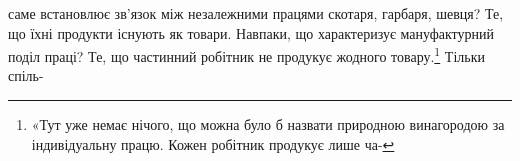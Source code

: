 саме встановлює зв’язок між незалежними працями скотаря,
гарбаря, шевця? Те, що їхні продукти існують як товари. Навпаки,
що характеризує мануфактурний поділ праці? Те, що
частинний робітник не продукує жодного товару.\footnote{
«Тут уже немає нічого, що можна було б назвати природною винагородою
за індивідуальну працю. Кожен робітник продукує лише ча-
} Тільки спіль-